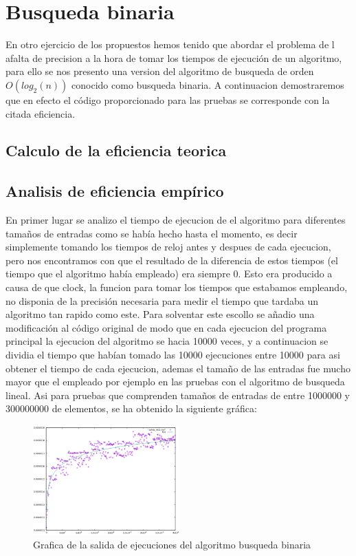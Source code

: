 \section{Busqueda binaria}
En otro ejercicio de los propuestos hemos tenido que abordar el problema de l afalta de precision a la hora de tomar los tiempos de ejecución de un algoritmo, para ello se nos presento una version del algoritmo de busqueda de orden $O(log_{2}(n))$ conocido como busqueda binaria. A continuacion demostraremos que en efecto el código proporcionado para las pruebas se corresponde con la citada eficiencia.

\subsection{Calculo de la eficiencia teorica}


\subsection{Analisis de eficiencia empírico}

En primer lugar se analizo el tiempo de ejecucion de el algoritmo para diferentes tamaños de entradas como se había hecho hasta el momento, es decir simplemente tomando los tiempos de reloj antes y despues de cada ejecucion, pero nos encontramos con que el resultado de la diferencia de estos tiempos (el tiempo que el algoritmo había empleado) era siempre 0. Esto era producido a causa de que clock, la funcion para tomar los tiempos que estabamos empleando, no disponia de la precisión necesaria para medir el tiempo que tardaba un algoritmo tan rapido como este. Para solventar este escollo se añadio una modificación al código original de modo que en cada ejecucion del programa principal la ejecucion del algoritmo se hacia 10000 veces, y a continuacion se dividia el tiempo que habían tomado las 10000 ejecuciones entre 10000 para asi obtener el tiempo de cada ejecucion, ademas el tamaño de las entradas fue mucho mayor que el empleado por ejemplo en las pruebas con el algoritmo de busqueda lineal. Asi para pruebas que comprenden tamaños de entradas de entre 1000000 y 300000000 de elementos, se ha obtenido la siguiente gráfica:

\begin{figure}[ht]
  \centering
  \includegraphics[width=0.5\textwidth]{./Imagenes/binaria_ajustada.png}
  \caption{Grafica de la salida de ejecuciones del algoritmo busqueda binaria}
\end{figure}

